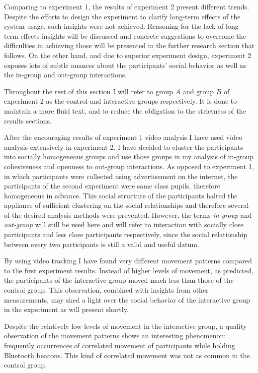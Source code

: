 \documentclass[a4paper,11pt]{article}
\newcommand{\definition}[1]{\emph{#1}}
\begin{document}
{Comparing to experiment 1, the results of experiment 2 present different trends.
Despite the efforts to design the experiment to clarify long-term effects of the system usage, such insights were not achieved.
Reasoning for the lack of long-term effects insights will be discussed and concrete suggestions to overcome the difficulties in achieving those will be presented in the further research section that follows.
On the other hand, and due to superior experiment design, experiment 2 exposes lots of subtle nuances about the participants' social behavior as well as the in-group and out-group interactions.

Throughout the rest of this section I will refer to group $A$ and group $B$ of experiment 2 as the control and interactive groups respectively.
It is done to maintain a more fluid text, and to reduce the obligation to the strictness of the results sections.

After the encouraging results of experiment 1 video analysis I have used video analysis extensively in experiment 2.
I have decided to cluster the participants into socially homogeneous groups and use those groups in my analysis of in-group cohesiveness and openness to out-group interactions.
As opposed to experiment 1, in which participants were collected using advertisement on the internet, the participants of the second experiment were same class pupils, therefore homogeneous in advance.
This social structure of the participants halted the appliance of sufficient clustering on the social relationships and therefore several of the desired analysis methods were prevented.
However, the terms \definition{in-group} and \definition{out-group} will still be used here and will refer to interaction with socially close participants and less close participants respectively, since the social relationship between every two participants is still a valid and useful datum.

By using video tracking I have found very different movement patterns compared to the first experiment results.
Instead of higher levels of movement, as predicted, the participants of the interactive group moved much less than those of the control group.
This observation, combined with insights from other measurements, may shed a light over the social behavior of the interactive group in the experiment as will present shortly.

Despite the relatively low levels of movement in the interactive group, a quality observation of the movement patterns shows an interesting phenomenon: frequently occurrences of correlated movement of participants while holding Bluetooth beacons.
This kind of correlated movement was not as common in the control group.

}
\end{document}
